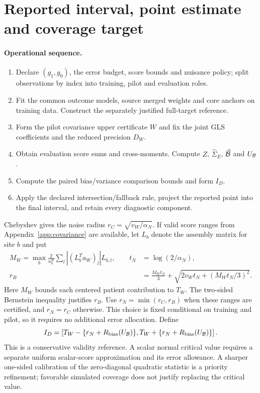 \section{Reported interval, point estimate and coverage target}

\paragraph{Operational sequence.}
\begin{enumerate}
\item Declare $(g_1,g_0)$, the error budget, score bounds and nuisance policy;
split observations by index into training, pilot and evaluation roles.
\item Fit the common outcome models, source merged weights and core anchors
on training data. Construct the separately justified full-target reference.
\item Form the pilot covariance upper certificate $W$ and fix the joint GLS
coefficients and the reduced precision $D_W$.
\item Obtain evaluation score sums and cross-moments. Compute $Z$,
$\widehat\Sigma_E$, $\widehat{\mathcal B}$ and $U_{\mathcal B}$.
\item Compute the paired bias/variance comparison bounds and form $I_D$.
\item Apply the declared intersection/fallback rule, project the reported
point into the final interval, and retain every diagnostic component.
\end{enumerate}

Chebyshev gives the noise radius $r_C=\sqrt{v_W/\alpha_N}$. If valid score
ranges from Appendix~\ref{app:covariance} are available, let $L_b$ denote
the assembly matrix for site $b$ and put
\begin{align*}
 M_W=\max_b\frac{2}{n_b^E}\sum_l |(L_b^Ta_W)_l|L_{b,l},\qquad
 t_N&=\log(2/\alpha_N),\\
 r_B&=\frac{M_Wt_N}{3}+\sqrt{2v_Wt_N+(M_Wt_N/3)^2}.
\end{align*}
Here $M_W$ bounds each centered patient contribution to $T_W$.
The two-sided Bernstein inequality justifies $r_B$. Use
$r_N=\min(r_C,r_B)$ when these ranges are certified, and $r_N=r_C$ otherwise.
This choice is fixed conditional on training and pilot, so it requires no
additional error allocation. Define
\begin{equation}
 I_D=\left[T_W-\{r_N+R_{\rm bias}(U_{\mathcal B})\},
           T_W+\{r_N+R_{\rm bias}(U_{\mathcal B})\}\right].
 \label{eq:core-interval}
\end{equation}
This is a conservative validity reference. A scalar normal critical value
requires a separate uniform scalar-score approximation and its error
allowance. A sharper one-sided calibration of the zero-diagonal quadratic
statistic is a priority refinement; favorable simulated coverage does not
justify replacing the critical value.

